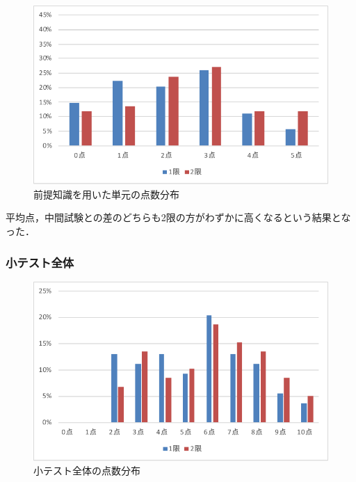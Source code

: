 \documentclass[a4j,12pt]{jsarticle}
\begin{document}
\begin{figure}[H]
\centering
\includegraphics[width=12cm]{3test.pdf}
\caption{前提知識を用いた単元の点数分布}
\label{fig:no}
\end{figure} 


\begin{table}[H]
\centering
{}
\caption{前提知識を用いた単元の平均点の比較}
\label{fig:12ank}
\end{table}

平均点，中間試験との差のどちらも2限の方がわずかに高くなるという結果となった．




\newpage
\subsubsection{小テスト全体}

\begin{figure}[H]
\centering
\includegraphics[width=12cm]{123test.pdf}
\caption{小テスト全体の点数分布}
\label{fig:no}
\end{figure}
\end{document}
